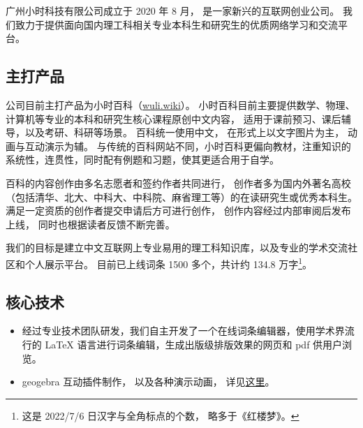 
广州小时科技有限公司成立于 2020 年 8 月， 是一家新兴的互联网创业公司。 我们致力于提供面向国内理工科相关专业本科生和研究生的优质网络学习和交流平台。

\subsection{主打产品}
公司目前主打产品为小时百科（\href{https://wuli.wiki}{wuli.wiki}）。 小时百科目前主要提供数学、物理、计算机等专业的本科和研究生核心课程原创中文内容， 适用于课前预习、课后辅导，以及考研、科研等场景。 百科统一使用中文， 在形式上以文字图片为主， 动画与互动演示为辅。 与传统的百科网站不同，小时百科更偏向教材，注重知识的系统性，连贯性，同时配有例题和习题，使其更适合用于自学。

百科的内容创作由多名志愿者和签约作者共同进行， 创作者多为国内外著名高校（包括清华、北大、中科大、中科院、麻省理工等）的在读研究生或优秀本科生。 满足一定资质的创作者提交申请后方可进行创作， 创作内容经过内部审阅后发布上线， 同时也根据读者反馈不断完善。

我们的目标是建立中文互联网上专业易用的理工科知识库，以及专业的学术交流社区和个人展示平台。 目前已上线词条 1500 多个，共计约 134.8 万字\footnote{这是 2022/7/6 日汉字与全角标点的个数， 略多于《红楼梦》。}。

\subsection{核心技术}
\begin{itemize}
\item 经过专业技术团队研发，我们自主开发了一个在线词条编辑器，使用学术界流行的 LaTeX 语言进行词条编辑，生成出版级排版效果的网页和 pdf 供用户浏览。
\item geogebra 互动插件制作， 以及各种演示动画， 详见\href{http://wuli.wiki/apps}{这里}。
\end{itemize}
